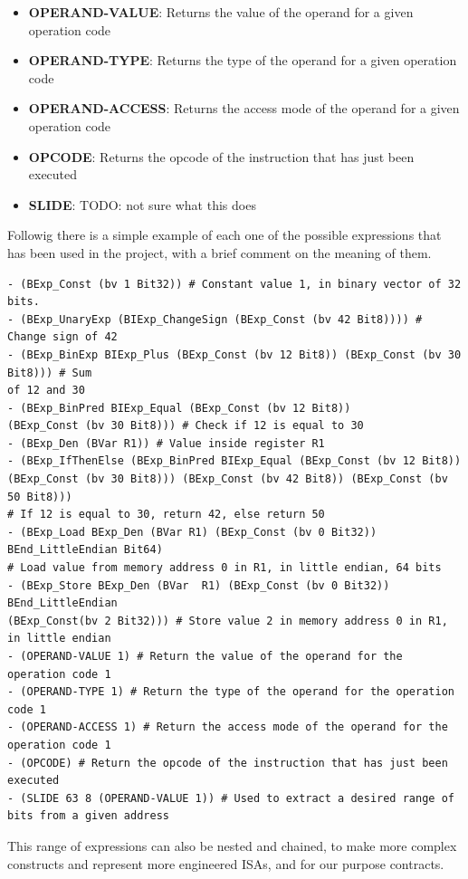\begin{itemize}
  \item \textbf{OPERAND-VALUE}: Returns the value of the operand for a given operation
    code

  \item \textbf{OPERAND-TYPE}: Returns the type of the operand for a given operation
    code

  \item \textbf{OPERAND-ACCESS}: Returns the access mode of the operand for a given
    operation code

  \item \textbf{OPCODE}: Returns the opcode of the instruction that has just been
    executed

  \item \textbf{SLIDE}: TODO: not sure what this does
\end{itemize}

Followig there is a simple example of each one of the possible expressions that
has been used in the project, with a brief comment on the meaning of them.
\begin{verbatim}
- (BExp_Const (bv 1 Bit32)) # Constant value 1, in binary vector of 32 bits.
- (BExp_UnaryExp (BIExp_ChangeSign (BExp_Const (bv 42 Bit8)))) # Change sign of 42
- (BExp_BinExp BIExp_Plus (BExp_Const (bv 12 Bit8)) (BExp_Const (bv 30 Bit8))) # Sum
of 12 and 30
- (BExp_BinPred BIExp_Equal (BExp_Const (bv 12 Bit8)) 
(BExp_Const (bv 30 Bit8))) # Check if 12 is equal to 30
- (BExp_Den (BVar R1)) # Value inside register R1
- (BExp_IfThenElse (BExp_BinPred BIExp_Equal (BExp_Const (bv 12 Bit8)) 
(BExp_Const (bv 30 Bit8))) (BExp_Const (bv 42 Bit8)) (BExp_Const (bv 50 Bit8))) 
# If 12 is equal to 30, return 42, else return 50
- (BExp_Load BExp_Den (BVar R1) (BExp_Const (bv 0 Bit32)) BEnd_LittleEndian Bit64) 
# Load value from memory address 0 in R1, in little endian, 64 bits
- (BExp_Store BExp_Den (BVar  R1) (BExp_Const (bv 0 Bit32)) BEnd_LittleEndian 
(BExp_Const(bv 2 Bit32))) # Store value 2 in memory address 0 in R1, in little endian
- (OPERAND-VALUE 1) # Return the value of the operand for the operation code 1
- (OPERAND-TYPE 1) # Return the type of the operand for the operation code 1
- (OPERAND-ACCESS 1) # Return the access mode of the operand for the operation code 1
- (OPCODE) # Return the opcode of the instruction that has just been executed
- (SLIDE 63 8 (OPERAND-VALUE 1)) # Used to extract a desired range of bits from a given address
\end{verbatim}

This range of expressions can also be nested and chained, to make more complex
constructs and represent more engineered ISAs, and for our purpose contracts.

